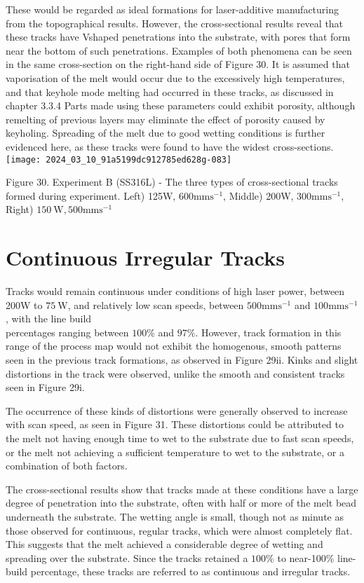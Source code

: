 \documentclass[10pt]{article}
\begin{document}
These would be regarded as ideal formations for laser-additive manufacturing from the topographical results. However, the cross-sectional results reveal that these tracks have Vshaped penetrations into the substrate, with pores that form near the bottom of such penetrations. Examples of both phenomena can be seen in the same cross-section on the right-hand side of Figure 30. It is assumed that vaporisation of the melt would occur due to the excessively high temperatures, and that keyhole mode melting had occurred in these tracks, as discussed in chapter 3.3.4 Parts made using these parameters could exhibit porosity, although remelting of previous layers may eliminate the effect of porosity caused by keyholing. Spreading of the melt due to good wetting conditions is further evidenced here, as these tracks were found to have the widest cross-sections.\\
\texttt{[image: 2024\_03\_10\_91a5199dc912785ed628g-083]}

Figure 30. Experiment B (SS316L) - The three types of cross-sectional tracks formed during experiment. Left) 125W, $600 \mathrm{mms}^{-1}$, Middle) 200W, $300 \mathrm{mms}^{-1}$, Right) $150 \mathrm{~W}, 500 \mathrm{mms}^{-1}$

\section*{Continuous Irregular Tracks}
Tracks would remain continuous under conditions of high laser power, between 200W to $75 \mathrm{~W}$, and relatively low scan speeds, between $500 \mathrm{mms}^{-1}$ and $100 \mathrm{mms}^{-1}$, with the line build\\
percentages ranging between $100 \%$ and $97 \%$. However, track formation in this range of the process map would not exhibit the homogenous, smooth patterns seen in the previous track formations, as observed in Figure 29ii. Kinks and slight distortions in the track were observed, unlike the smooth and consistent tracks seen in Figure 29i.

The occurrence of these kinds of distortions were generally observed to increase with scan speed, as seen in Figure 31. These distortions could be attributed to the melt not having enough time to wet to the substrate due to fast scan speeds, or the melt not achieving a sufficient temperature to wet to the substrate, or a combination of both factors.

The cross-sectional results show that tracks made at these conditions have a large degree of penetration into the substrate, often with half or more of the melt bead underneath the substrate. The wetting angle is small, though not as minute as those observed for continuous, regular tracks, which were almost completely flat. This suggests that the melt achieved a considerable degree of wetting and spreading over the substrate. Since the tracks retained a $100 \%$ to near-100\% line-build percentage, these tracks are referred to as continuous and irregular tracks.
\end{document}
